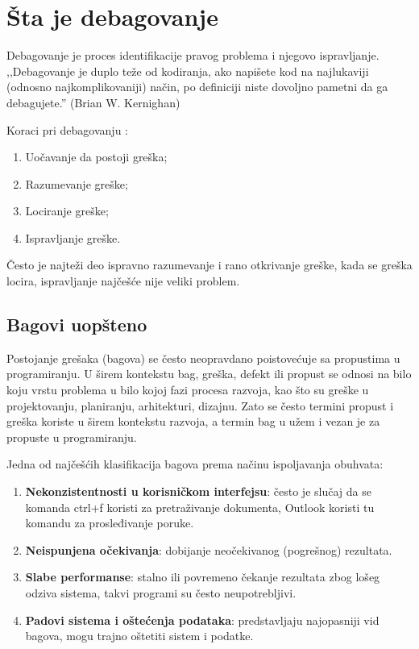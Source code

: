 \documentclass[a4paper]{article}
\begin{document}
\section{Šta je debagovanje}
\label{sec:sta je debagovanje}

Debagovanje je proces identifikacije pravog problema i njegovo ispravljanje.
,,Debagovanje je duplo teže od kodiranja, ako napišete kod na najlukaviji
(odnosno najkomplikovaniji) način, po definiciji niste dovoljno pametni da ga
debagujete.'' (Brian W. Kernighan) \cite{debagovanje_vladaf}


Koraci pri debagovanju \cite{bagovi_smalkov}:
\begin{enumerate}
\item Uočavanje da postoji greška;
\item Razumevanje greške;
\item Lociranje greške;
\item Ispravljanje greške.
\end{enumerate}

Često je najteži deo ispravno razumevanje i rano otkrivanje greške, kada se greška locira, ispravljanje najčešće nije veliki problem.


\subsection{Bagovi uopšteno}
\label{subsec:podnaslov1}

Postojanje grešaka (bagova) se često neopravdano poistovećuje sa propustima u programiranju.  U širem kontekstu bag, greška, defekt ili propust se odnosi na bilo koju vrstu problema u bilo kojoj fazi procesa razvoja, kao što su greške u projektovanju, planiranju, arhitekturi, dizajnu. Zato se često termini propust i greška koriste u širem kontekstu razvoja, a termin bag u užem i vezan je za propuste u programiranju.

Jedna od najčešćih klasifikacija bagova prema načinu ispoljavanja obuhvata:
\begin{enumerate}
	\item \textbf{Nekonzistentnosti u korisničkom interfejsu}: često je slučaj da se komanda ctrl+f koristi za pretraživanje dokumenta, Outlook koristi   
	tu komandu za prosleđivanje poruke.
	\item \textbf{Neispunjena očekivanja}: dobijanje neočekivanog (pogrešnog) rezultata.
	\item \textbf{Slabe performanse}: stalno ili povremeno čekanje rezultata zbog lošeg odziva sistema, takvi programi su često neupotrebljivi.
	\item \textbf{Padovi sistema i oštećenja podataka}: predstavljaju najopasniji vid bagova, mogu trajno oštetiti sistem i podatke.
\end{enumerate}
\end{document}
